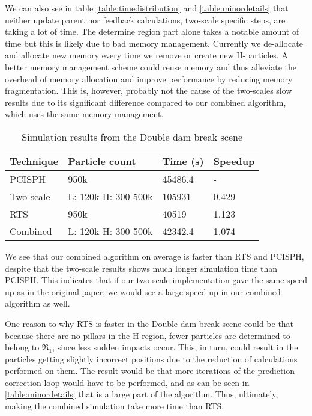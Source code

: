 \documentclass[../../main.tex]{subfiles}
\begin{document}
We can also see in table \ref{table:timedistribution} and \ref{table:minordetails} that neither update parent nor feedback calculations, two-scale specific steps, are taking a lot of time. The determine region part alone takes a notable amount of time but this is likely due to bad memory management. Currently we de-allocate and allocate new memory every time we remove or create new H-particles. A better memory management scheme could reuse memory and thus alleviate the overhead of memory allocation and improve performance by reducing memory fragmentation. This is, however, probably not the cause of the two-scales slow results due to its significant difference compared to our combined algorithm, which uses the same memory management. 

\begin{table}[]
\centering
\caption{Simulation results from the Double dam break scene}
\label{table:doubledam}
\begin{tabular}{llll}
\hline
Technique & Particle count      & Time (s) & Speedup \\ \hline
PCISPH    & 950k                & 45486.4  & -       \\
Two-scale & L: 120k H: 300-500k & 105931   & 0.429   \\
RTS       & 950k                & 40519    & 1.123   \\
Combined  & L: 120k H: 300-500k & 42342.4  & 1.074   \\ \hline
\end{tabular}
\end{table}

We see that our combined algorithm on average is faster than RTS and PCISPH, despite that the two-scale results shows much longer simulation time than PCISPH. This indicates that if our two-scale implementation gave the same speed up as in the original paper, we would see a large speed up in our combined algorithm as well. 

One reason to why RTS is faster in the Double dam break scene could be that because there are no pillars in the H-region, fewer particles are determined to belong to $\Re_1$, since less sudden impacts occur. This, in turn, could result in the particles getting slightly incorrect positions due to the reduction of calculations performed on them. The result would be that more iterations of the prediction correction loop would have to be performed, and as can be seen in \ref{table:minordetails} that is a large part of the algorithm. Thus, ultimately, making the combined simulation take more time than RTS.
\end{document}
